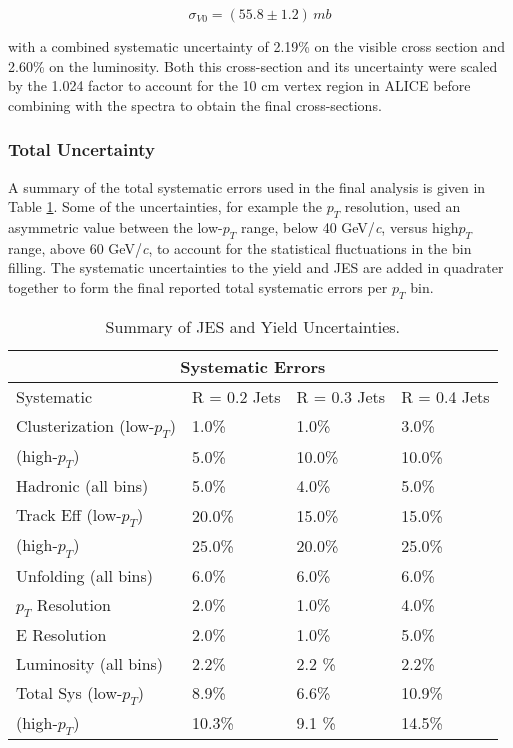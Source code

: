 \begin{equation}
\sigma_{V0} = (55.8 \pm 1.2) \, mb
\label{eq:xlumdef}
\end{equation}

\noindent
with a combined systematic uncertainty of 2.19\% on the visible cross section and 2.60\% on the luminosity.  Both this cross-section and its uncertainty were scaled by the 1.024 factor to account for the 10 cm vertex region in ALICE before combining with the spectra to obtain the final cross-sections.


\subsubsection{Total Uncertainty}

A summary of the total systematic errors used in the final analysis is given in Table \ref{table:1}.  Some of the uncertainties, for example the $p_{T}$ resolution, used an asymmetric value between the low-$p_{T}$ range, below 40 GeV/\textit{c}, versus high$p_{T}$ range, above 60 GeV/\textit{c}, to account for the statistical fluctuations in the bin filling.  The systematic uncertainties to the yield and JES are added in quadrater together to form the final reported total systematic errors per $p_{T}$ bin.
\newline

\begin{table}[h!]
\centering
\caption{Summary of JES and Yield Uncertainties.}
\begin{tabular}{ |p{5cm}||p{3cm}|p{3cm}|p{3cm}|  }
 \hline
 \multicolumn{4}{|c|}{Systematic Errors} \\
 \hline
 Systematic &R = 0.2 Jets & R = 0.3 Jets& R = 0.4 Jets\\
 \hline
Clusterization (low-$p_{T}$) & 1.0\%    &1.0\%&  3.0\%\\
 (high-$p_{T}$)           &  5.0\%  & 10.0\%   &  10.0\%\\
Hadronic (all bins)&   5.0\% & 4.0\% & 5.0\%\\
Track Eff (low-$p_{T}$)&20.0\% & 15.0\% & 15.0\%\\
 (high-$p_{T}$)            &  25.0\%  & 20.0\%   &  25.0\%\\
Unfolding (all bins)& 6.0\% & 6.0\%&  6.0\%\\
$p_{T}$ Resolution & 2.0\% & 1.0\% & 4.0\%\\
E Resolution& 2.0\%   &1.0\% & 5.0\%\\
Luminosity (all bins) & 2.2\%  & 2.2 \% & 2.2\%\\
 \hline
 \hline
Total Sys (low-$p_{T}$) & 8.9\%  & 6.6\% & 10.9\%\\
(high-$p_{T}$) & 10.3\%  & 9.1 \% & 14.5\%\\
\hline
\end{tabular}

\label{table:1}
\end{table}


